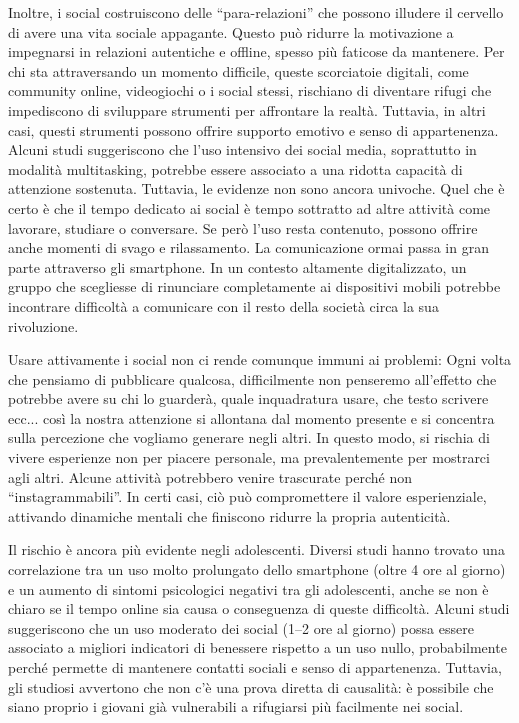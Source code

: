 \documentclass[12pt]{book} %
\begin{document}
\begin{mdframed}[linewidth=1pt]
Inoltre, i social costruiscono delle “para-relazioni” che possono illudere il cervello di avere una vita sociale appagante. Questo può ridurre la motivazione a impegnarsi in relazioni autentiche e offline, spesso più faticose da mantenere. Per chi sta attraversando un momento difficile, queste scorciatoie digitali, come community online, videogiochi o i social stessi, rischiano di diventare rifugi che impediscono di sviluppare strumenti per affrontare la realtà. Tuttavia, in altri casi, questi strumenti possono offrire supporto emotivo e senso di appartenenza. Alcuni studi suggeriscono che l’uso intensivo dei social media, soprattutto in modalità multitasking, potrebbe essere associato a una ridotta capacità di attenzione sostenuta. Tuttavia, le evidenze non sono ancora univoche. Quel che è certo è che il tempo dedicato ai social è tempo sottratto ad altre attività come lavorare, studiare o conversare. Se però l’uso resta contenuto, possono offrire anche momenti di svago e rilassamento.
La comunicazione ormai passa in gran parte attraverso gli smartphone. In un contesto altamente digitalizzato, un gruppo che scegliesse di rinunciare completamente ai dispositivi mobili potrebbe incontrare difficoltà a comunicare con il resto della società circa la sua rivoluzione.

Usare attivamente i social non ci rende comunque immuni ai problemi: Ogni volta che pensiamo di pubblicare qualcosa, difficilmente non penseremo all'effetto che potrebbe avere su chi lo guarderà, quale inquadratura usare, che testo scrivere ecc... così la nostra attenzione si allontana dal momento presente e si concentra sulla percezione che vogliamo generare negli altri. In questo modo, si rischia di vivere esperienze non per piacere personale, ma prevalentemente per mostrarci agli altri. Alcune attività potrebbero venire trascurate perché non “instagrammabili”. In certi casi, ciò può compromettere il valore esperienziale, attivando dinamiche mentali che finiscono ridurre la propria autenticità.

Il rischio è ancora più evidente negli adolescenti. Diversi studi hanno trovato una correlazione tra un uso molto prolungato dello smartphone (oltre 4 ore al giorno) e un aumento di sintomi psicologici negativi tra gli adolescenti, anche se non è chiaro se il tempo online sia causa o conseguenza di queste difficoltà. Alcuni studi suggeriscono che un uso moderato dei social (1–2 ore al giorno) possa essere associato a migliori indicatori di benessere rispetto a un uso nullo, probabilmente perché permette di mantenere contatti sociali e senso di appartenenza. Tuttavia, gli studiosi avvertono che non c’è una prova diretta di causalità: è possibile che siano proprio i giovani già vulnerabili a rifugiarsi più facilmente nei social.


\end{mdframed}
\end{document}
